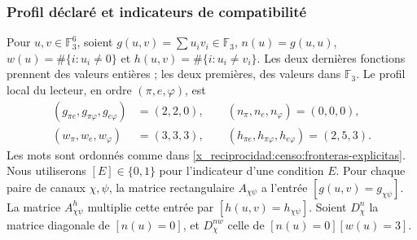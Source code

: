 \subsubsection{Profil déclaré et indicateurs de compatibilité}

Pour \(u,v\in\mathbb F_3^6\), soient
\(g(u,v)=\sum u_iv_i\in\mathbb F_3\),
\(n(u)=g(u,u)\), \(w(u)=\#\{i:u_i\ne0\}\) et
\(h(u,v)=\#\{i:u_i\ne v_i\}\). Les deux dernières fonctions prennent
des valeurs entières ; les deux premières, des valeurs dans \(\mathbb F_3\).
Le profil local du lecteur, en ordre \((\pi,e,\varphi)\), est
\begin{equation}
 \begin{split}
 (g_{\pi e},g_{\pi\varphi},g_{e\varphi})&=(2,2,0),\qquad
 (n_\pi,n_e,n_\varphi)=(0,0,0),\\
 (w_\pi,w_e,w_\varphi)&=(3,3,3),\qquad
 (h_{\pi e},h_{\pi\varphi},h_{e\varphi})=(2,5,3).
 \end{split}
 \label{x_reciprocidad:censo:perfil-local}
\end{equation}
Les mots sont ordonnés comme dans \eqref{x_reciprocidad:censo:fronteras-explicitas}.
Nous utiliserons \([E]\in\{0,1\}\) pour l'indicateur d'une condition \(E\).
Pour chaque paire de canaux \(\chi,\psi\), la matrice rectangulaire
\(A_{\chi\psi}\) a l'entrée \([g(u,v)=g_{\chi\psi}]\).
La matrice \(A^{h}_{\chi\psi}\) multiplie cette entrée par
\([h(u,v)=h_{\chi\psi}]\). Soient \(D_\chi^n\) la matrice diagonale
de \([n(u)=0]\), et \(D_\chi^{nw}\) celle de
\([n(u)=0][w(u)=3]\).

